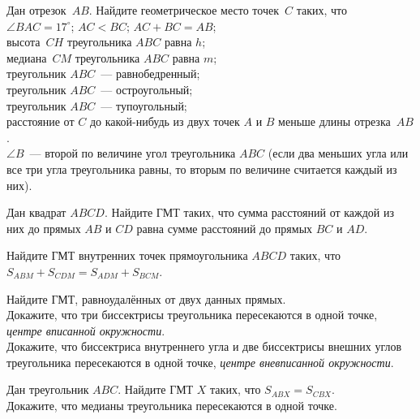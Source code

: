 \begin{problems}

\item
Дан отрезок~$AB$.
Найдите геометрическое место точек~$C$ таких, что
\\
\sp $\angle{BAC} = 17^{\circ}$; 
\quad
\sp $AC < BC$; 
\quad
\sp $AC + BC = AB$; 
\\
\sp высота~$CH$ треугольника $ABC$ равна $h$; 
\\
\sp медиана~$CM$ треугольника $ABC$ равна $m$; 
\\
\sp треугольник $ABC$~--- равнобедренный; 
\\
\sp треугольник $ABC$~--- остроугольный; 
\\
\sp треугольник $ABC$~--- тупоугольный; 
\\
\sp
расстояние от $C$ до какой-нибудь из двух точек $A$ и $B$ меньше длины
отрезка~$AB$.
\\
\sp
$\angle B $~--- второй по величине угол треугольника $ABC$
(если два меньших угла или все три угла треугольника равны, то вторым
по величине считается каждый из них).



\item
Дан квадрат $ABCD$.
Найдите ГМТ таких, что сумма расстояний от каждой из них до прямых $AB$ и $CD$
равна сумме расстояний до прямых $BC$ и $AD$. 

\item
Найдите ГМТ внутренних точек прямоугольника $ABCD$ таких, что
$S_{ABM} + S_{CDM} = S_{ADM} + S_{BCM}$.

\item
\sp
Найдите ГМТ, равноудалённых от двух данных прямых.
\\
\sp
Докажите, что три биссектрисы треугольника пересекаются в одной точке,
\emph{центре вписанной окружности}.
\\
\sp
Докажите, что биссектриса внутреннего угла и две биссектрисы внешних углов
треугольника пересекаются в одной точке, \emph{центре вневписанной окружности}.

\item
\sp
Дан треугольник $ABC$.
Найдите ГМТ $X$ таких, что $S_{ABX} = S_{CBX}$.
\\
\sp
Докажите, что медианы треугольника пересекаются в одной точке. 


\end{problems}
